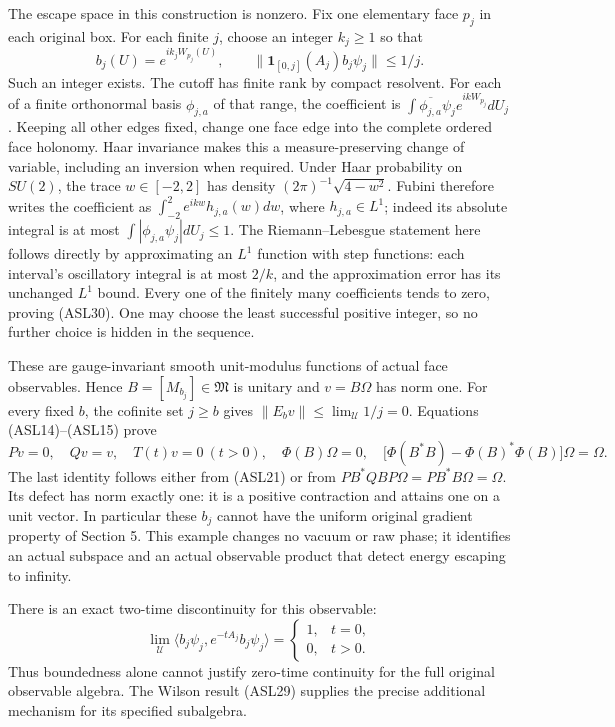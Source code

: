 \documentclass[11pt]{article}
\begin{document}
The escape space in this construction is nonzero. Fix one elementary face \(p_j\) in each original box. For each finite \(j\), choose an integer \(k_j\ge1\) so that
\[
 b_j(U)=e^{ik_jW_{p_j}(U)},\qquad
 \|\mathbf1_{[0,j]}(A_j)b_j\psi_j\|\le1/j.
 \tag{ASL30}
\]
Such an integer exists. The cutoff has finite rank by compact resolvent. For each of a finite orthonormal basis \(\phi_{j,a}\) of that range, the coefficient is
\(\int\overline{\phi_{j,a}}\psi_j e^{ikW_{p_j}}dU_j\). Keeping all other edges fixed, change one face edge into the complete ordered face holonomy. Haar invariance makes this a measure-preserving change of variable, including an inversion when required. Under Haar probability on \(SU(2)\), the trace \(w\in[-2,2]\) has density \((2\pi)^{-1}\sqrt{4-w^2}\). Fubini therefore writes the coefficient as \(\int_{-2}^2e^{ikw}h_{j,a}(w)dw\), where \(h_{j,a}\in L^1\); indeed its absolute integral is at most \(\int|\phi_{j,a}\psi_j|dU_j\le1\). The Riemann–Lebesgue statement here follows directly by approximating an \(L^1\) function with step functions: each interval's oscillatory integral is at most \(2/k\), and the approximation error has its unchanged \(L^1\) bound. Every one of the finitely many coefficients tends to zero, proving (ASL30). One may choose the least successful positive integer, so no further choice is hidden in the sequence.

These are gauge-invariant smooth unit-modulus functions of actual face observables. Hence \(B=[M_{b_j}]\in\mathfrak M\) is unitary and \(v=B\Omega\) has norm one. For every fixed \(b\), the cofinite set \(j\ge b\) gives \(\|E_bv\|\le\lim_{\mathcal U}1/j=0\). Equations (ASL14)–(ASL15) prove
\[
 Pv=0,\quad Qv=v,\quad T(t)v=0\ (t>0),\quad
 \Phi(B)\Omega=0,\quad
 \bigl[\Phi(B^*B)-\Phi(B)^*\Phi(B)\bigr]\Omega=\Omega.
 \tag{ASL31}
\]
The last identity follows either from (ASL21) or from \(PB^*QBP\Omega=PB^*B\Omega=\Omega\). Its defect has norm exactly one: it is a positive contraction and attains one on a unit vector. In particular these \(b_j\) cannot have the uniform original gradient property of Section 5. This example changes no vacuum or raw phase; it identifies an actual subspace and an actual observable product that detect energy escaping to infinity.

There is an exact two-time discontinuity for this observable:
\[
 \lim_{\mathcal U}\langle b_j\psi_j,e^{-tA_j}b_j\psi_j\rangle
 =\begin{cases}1,&t=0,\\0,&t>0.\end{cases}
 \tag{ASL32}
\]
Thus boundedness alone cannot justify zero-time continuity for the full original observable algebra. The Wilson result (ASL29) supplies the precise additional mechanism for its specified subalgebra.
\end{document}
